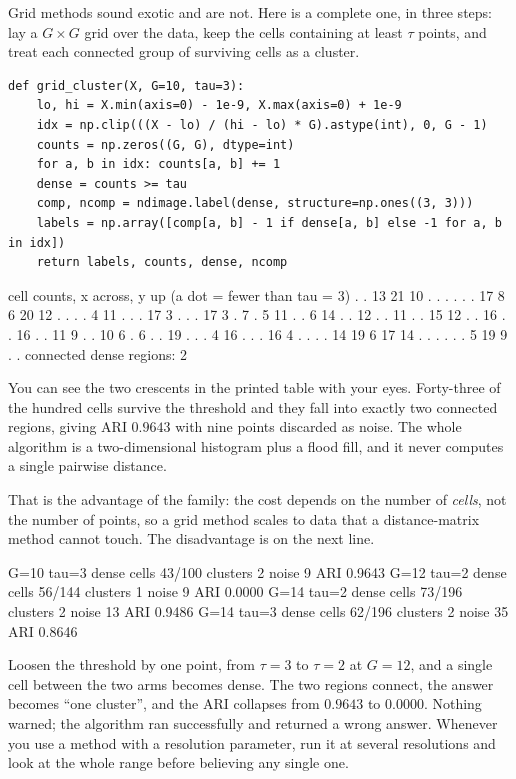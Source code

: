 \documentclass[11pt]{article}
\begin{document}
Grid methods sound exotic and are not. Here is a complete one, in three steps:
lay a $G \times G$ grid over the data, keep the cells containing at least
$\tau$ points, and treat each connected group of surviving cells as a cluster.

\begin{lstlisting}
def grid_cluster(X, G=10, tau=3):
    lo, hi = X.min(axis=0) - 1e-9, X.max(axis=0) + 1e-9
    idx = np.clip(((X - lo) / (hi - lo) * G).astype(int), 0, G - 1)
    counts = np.zeros((G, G), dtype=int)
    for a, b in idx: counts[a, b] += 1
    dense = counts >= tau
    comp, ncomp = ndimage.label(dense, structure=np.ones((3, 3)))
    labels = np.array([comp[a, b] - 1 if dense[a, b] else -1 for a, b in idx])
    return labels, counts, dense, ncomp
\end{lstlisting}
\begin{codeout}
cell counts, x across, y up (a dot = fewer than tau = 3)
      .   .  13  21  10   .   .   .   .   .
      .  17   8   6  20  12   .   .   .   .
      4  11   .   .   .  17   3   .   .   .
     17   3   .   7   .   5  11   .   .   6
     14   .   .  12   .   .  11   .   .  15
     12   .   .  16   .   .  16   .   .  11
      9   .   .  10   6   .   6   .   .  19
      .   .   .   4  16   .   .   .  16   4
      .   .   .   .  14  19   6  17  14   .
      .   .   .   .   .   5  19   9   .   .
connected dense regions: 2
\end{codeout}

You can see the two crescents in the printed table with your eyes. Forty-three
of the hundred cells survive the threshold and they fall into exactly two
connected regions, giving ARI $\mathbf{0.9643}$ with nine points discarded as
noise. The whole algorithm is a two-dimensional histogram plus a flood fill,
and it never computes a single pairwise distance.

That is the advantage of the family: the cost depends on the number of
\emph{cells}, not the number of points, so a grid method scales to data that a
distance-matrix method cannot touch. The disadvantage is on the next line.

\begin{codeout}
G=10 tau=3  dense cells  43/100  clusters 2  noise  9  ARI 0.9643
G=12 tau=2  dense cells  56/144  clusters 1  noise  9  ARI 0.0000
G=14 tau=2  dense cells  73/196  clusters 2  noise 13  ARI 0.9486
G=14 tau=3  dense cells  62/196  clusters 2  noise 35  ARI 0.8646
\end{codeout}

\begin{caution}
Loosen the threshold by one point, from $\tau = 3$ to $\tau = 2$ at
$G = 12$, and a single cell between the two arms becomes dense. The two
regions connect, the answer becomes ``one cluster'', and the ARI collapses
from $0.9643$ to $\mathbf{0.0000}$. Nothing warned; the algorithm ran
successfully and returned a wrong answer. Whenever you use a method with a
resolution parameter, run it at several resolutions and look at the whole
range before believing any single one.
\end{caution}
\end{document}
